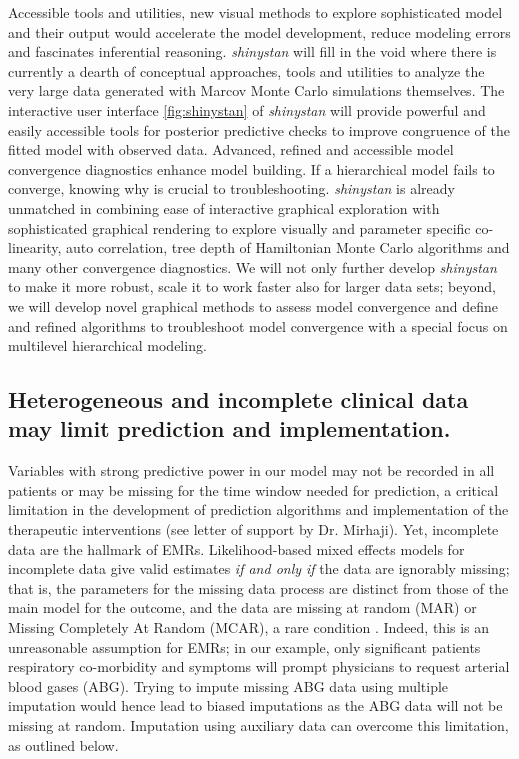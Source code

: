 \documentclass[11pt,notitlepage]{article}
\begin{document}
Accessible tools and utilities, new visual methods to explore sophisticated model and
their output would accelerate the model development, reduce modeling errors and 
fascinates inferential reasoning. \textit{shinystan} will fill in the void where 
there is currently a dearth of conceptual approaches, tools and utilities to 
analyze the very large data generated with Marcov Monte Carlo simulations 
themselves. The interactive user interface \ref{fig:shinystan} of \textit{shinystan} 
will provide powerful and easily accessible tools for posterior predictive checks 
to improve congruence of the fitted model with observed data. Advanced, refined 
and accessible model convergence diagnostics enhance model building. If a hierarchical 
model fails to converge, knowing why is crucial to troubleshooting. \textit{shinystan} 
is already unmatched in combining ease of interactive graphical exploration 
with sophisticated graphical rendering to explore visually and parameter 
specific co-linearity, auto correlation, tree depth of Hamiltonian Monte 
Carlo algorithms and many other convergence diagnostics. We will not only 
further develop \textit{shinystan} to make it more robust, scale it to work 
faster also for larger data sets; beyond, we will develop novel graphical 
methods to assess model convergence and define and refined algorithms to 
troubleshoot model convergence with a special focus on multilevel hierarchical 
modeling. 

 

\subsection*{Heterogeneous and incomplete clinical data may limit prediction and implementation.}
Variables with strong predictive power in our model may not be recorded in all patients 
or may be missing for the time window needed for prediction, a critical limitation 
in the development of prediction algorithms and implementation of the 
therapeutic interventions (see letter of support by Dr. Mirhaji). 
Yet, incomplete data are the hallmark of EMRs. 
Likelihood-based mixed effects models for incomplete data give valid estimates 
\textit{if and only if } the data are ignorably missing; that is, the parameters 
for the missing data process are distinct from those of the main model for the 
outcome, and the data are missing at random (MAR) or Missing Completely At Random 
(MCAR), a rare condition \cite{Rubin1976}. Indeed, this is an unreasonable assumption 
for EMRs; in our example, only significant patients respiratory co-morbidity and 
symptoms will prompt physicians to request arterial blood gases (ABG). Trying to 
impute missing ABG data using multiple imputation would  hence lead to biased 
imputations as the ABG data will not be missing at random. Imputation using 
auxiliary data can overcome this limitation, as outlined below.
\end{document}
